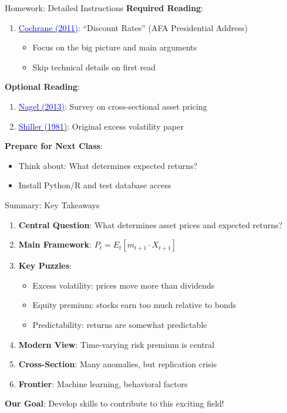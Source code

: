 \documentclass{beamer}
\begin{document}
\begin{frame}{Homework: Detailed Instructions}
	\textbf{Required Reading}:
	\begin{enumerate}
		\item \href{https://doi.org/10.1111/j.1540-6261.2011.01671.x}{\textcolor{blue}{Cochrane (2011)}}: ``Discount Rates'' (AFA Presidential Address)
		\begin{itemize}
			\item Focus on the big picture and main arguments
			\item Skip technical details on first read
		\end{itemize}
	\end{enumerate}
	
	\vspace{10pt}
	\textbf{Optional Reading}:
	\begin{enumerate}
		\item \href{https://doi.org/10.1146/annurev-financial-110112-120833}{\textcolor{blue}{Nagel (2013)}}: Survey on cross-sectional asset pricing
		\item \href{http://www.jstor.org/stable/1802789}{\textcolor{blue}{Shiller (1981)}}: Original excess volatility paper
	\end{enumerate}
	
	\vspace{10pt}
	\textbf{Prepare for Next Class}:
	\begin{itemize}
		\item Think about: What determines expected returns?
		\item Install Python/R and test database access
	\end{itemize}
\end{frame}

\begin{frame}{Summary: Key Takeaways}
	\begin{enumerate}
		\item \textbf{Central Question}: What determines asset prices and expected returns?
		\item \textbf{Main Framework}: $P_t = E_t[m_{t+1} \cdot X_{t+1}]$
		\item \textbf{Key Puzzles}:
		\begin{itemize}
			\item Excess volatility: prices move more than dividends
			\item Equity premium: stocks earn too much relative to bonds
			\item Predictability: returns are somewhat predictable
		\end{itemize}
		\item \textbf{Modern View}: Time-varying risk premium is central
		\item \textbf{Cross-Section}: Many anomalies, but replication crisis
		\item \textbf{Frontier}: Machine learning, behavioral factors
	\end{enumerate}
	
	\vspace{10pt}
	\textbf{Our Goal}: Develop skills to contribute to this exciting field!
\end{frame}
\end{document}
